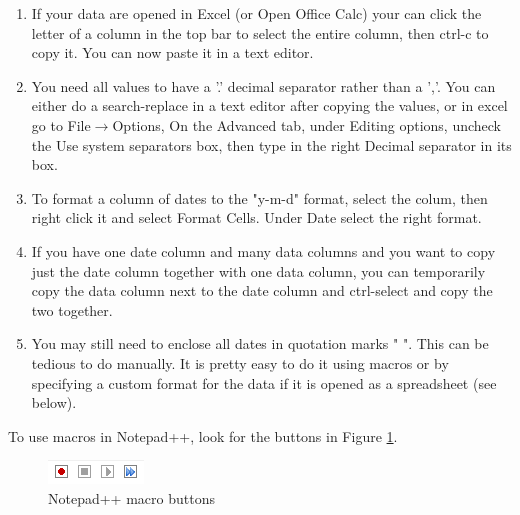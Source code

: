 \documentclass[11pt]{article}
\theoremstyle{definition}
\begin{document}
\begin{enumerate}[i]
\item If your data are opened in Excel (or Open Office Calc) your can click the letter of a column in the top bar to select the entire column, then ctrl-c to copy it. You can now paste it in a text editor.
\item You need all values to have a '.' decimal separator rather than a ','. You can either do a search-replace in a text editor after copying the values, or in excel go to File$\rightarrow$Options, On the Advanced tab, under Editing options, uncheck the Use system separators box, then type in the right Decimal separator in its box.
\item To format a column of dates to the "y-m-d" format, select the colum, then right click it and select Format Cells. Under Date select the right format.
\item If you have one date column and many data columns and you want to copy just the date column together with one data column, you can temporarily copy the data column next to the date column and ctrl-select and copy the two together.
\item You may still need to enclose all dates in quotation marks " ". This can be tedious to do manually. It is pretty easy to do it using macros or by specifying a custom format for the data if it is opened as a spreadsheet (see below).
\end{enumerate}

To use macros in Notepad++, look for the buttons in Figure \ref{fig:macro}.
\begin{figure}[H]
\centering
\includegraphics{img/notepadmacro}
\caption{Notepad++ macro buttons}\label{fig:macro}
\end{figure}
\end{document}
